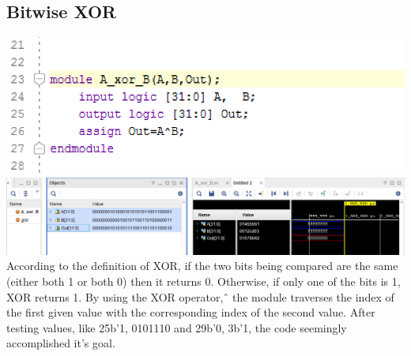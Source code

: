 \documentclass{article}
\begin{document}
\subsection{Bitwise XOR}
\includegraphics[scale=0.5]{photos/xor_code}
\break
\includegraphics[scale=0.4]{photos/xor_simulation}
\break
According to the definition of XOR, if the two bits being compared are the same (either both 1 or both 0) then it returns 0. Otherwise, if only one of the bits is 1, XOR returns 1. By using the XOR operator, \^ \, the module traverses the index of the first given value with the corresponding index of the second value. After testing values, like {25b'1, 0101110} and {29b'0, 3b'1}, the code seemingly accomplished it's goal.
\end{document}
